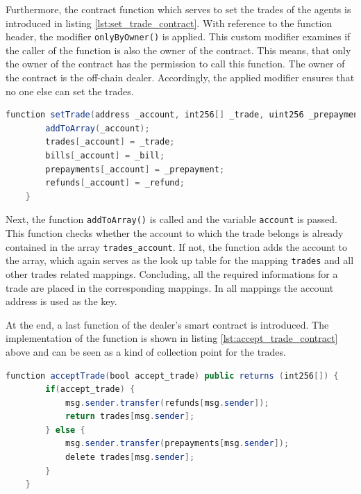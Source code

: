 Furthermore, the contract function which serves to set the trades of the agents is introduced in listing \ref{lst:set_trade_contract}.
With reference to the function header, the modifier \verb|onlyByOwner()| is applied.
This custom modifier examines if the caller of the function is also the owner of the contract. This means, that 
only the owner of the contract has the permission to call this function.
The owner of the contract is the off-chain dealer. Accordingly, the applied modifier ensures that no one else can set 
the trades. 

\begin{lstlisting}[float=htbp, label=lst:set_trade_contract, caption=Setting the trades, language=Java]
    function setTrade(address _account, int256[] _trade, uint256 _prepayment, uint256 _bill, uint256 _refund) public onlyByOwner() {
        addToArray(_account);
        trades[_account] = _trade;
        bills[_account] = _bill;
        prepayments[_account] = _prepayment;
        refunds[_account] = _refund;
    }
\end{lstlisting}

Next, the function \verb|addToArray()| is called and the variable \verb|account| is passed. 
This function checks whether the account to which the trade belongs is already contained in the array \verb|trades_account|.
If not, the function adds the account to the array, which again serves as the look up table for the
mapping \verb|trades| and all other trades related mappings.
Concluding, all the required informations for a trade are placed in the corresponding mappings. In all
mappings the account address is used as the key.

At the end, a last function of the dealer's smart contract is introduced.
The implementation of the function is shown in listing \ref{lst:accept_trade_contract} above
and can be seen as a kind of collection point for the trades.

\begin{lstlisting}[float=htbp, label=lst:accept_trade_contract, caption=Collection point of trades, language=Java]
    function acceptTrade(bool accept_trade) public returns (int256[]) {
        if(accept_trade) {
            msg.sender.transfer(refunds[msg.sender]);
            return trades[msg.sender];
        } else {
            msg.sender.transfer(prepayments[msg.sender]);
            delete trades[msg.sender];
        }
    }
\end{lstlisting}

